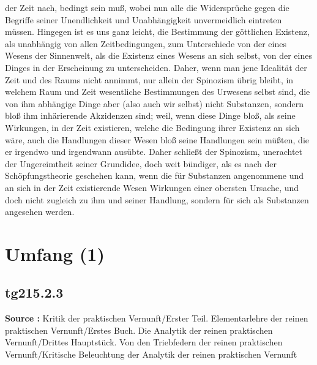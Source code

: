 \documentclass[a4paper,12pt,twoside]{book}
\newcommand{\unnumberedsection}[1]{
	\section*{#1}
	\addcontentsline{toc}{section}{#1}
	\markright{#1}
}
\begin{document}
der Zeit nach, bedingt sein muß, wobei nun alle die Widersprüche gegen die Begriffe seiner Unendlichkeit und Unabhängigkeit unvermeidlich eintreten müssen. Hingegen ist es uns ganz leicht, die Bestimmung der göttlichen Existenz, als unabhängig von allen Zeitbedingungen, zum Unterschiede von der eines Wesens der Sinnenwelt, als die Existenz eines Wesens an sich selbst, von der eines Dinges in der Erscheinung zu unterscheiden. Daher, wenn man jene Idealität der Zeit und des Raums nicht annimmt, nur allein der Spinozism übrig bleibt, in welchem Raum und Zeit wesentliche Bestimmungen des Urwesens selbst sind, die von ihm abhängige Dinge aber (also auch wir selbst) nicht Substanzen, sondern bloß ihm inhärierende Akzidenzen sind; weil, wenn diese Dinge bloß, als seine Wirkungen, in der Zeit existieren, welche die Bedingung ihrer Existenz an sich wäre, auch die Handlungen dieser Wesen bloß seine Handlungen sein müßten, die er irgendwo und irgendwann ausübte. Daher schließt der Spinozism, unerachtet der Ungereimtheit seiner Grundidee, doch weit bündiger, als es nach der Schöpfungstheorie geschehen kann, wenn die für Substanzen angenommene und an sich in der Zeit existierende Wesen Wirkungen einer obersten Ursache, und doch nicht zugleich zu ihm und seiner Handlung, sondern für sich als Substanzen angesehen werden. 
	
	\unnumberedsection{Umfang (1)} 
	\subsection*{tg215.2.3} 
	\textbf{Source : }Kritik der praktischen Vernunft/Erster Teil. Elementarlehre der reinen praktischen Vernunft/Erstes Buch. Die Analytik der reinen praktischen Vernunft/Drittes Hauptstück. Von den Triebfedern der reinen praktischen Vernunft/Kritische Beleuchtung der Analytik der reinen praktischen Vernunft\\  
	
\end{document}

